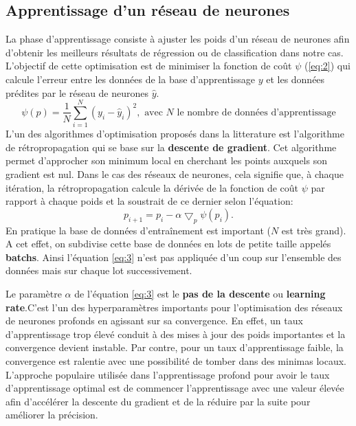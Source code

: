     \subsection{Apprentissage d'un réseau de neurones}
    La phase d’apprentissage consiste à ajuster les poids d’un réseau de neurones afin d’obtenir les meilleurs résultats de régression ou de classification dans notre cas. L’objectif de cette optimisation est de minimiser la fonction de coût $\psi$ (\ref{eq:2}) qui calcule l’erreur entre les données de la base d’apprentissage $y$ et les données prédites par le réseau de neurones $\hat{y}$.
    \begin{equation}\label{eq:2}
        \psi(p) = \frac{1}{N}\sum_{i=1}^{N}(y_{i}-\hat{y}_{i})^{2}, \text{ avec } N \text{ le nombre de données d'apprentissage}
    \end{equation}
    L'un des algorithmes d'optimisation proposés dans la litterature est l’algorithme de rétropropagation qui se base sur la \textbf{descente de gradient}. Cet algorithme permet d’approcher son minimum local en cherchant les points auxquels son gradient est nul. Dans le cas des réseaux de neurones, cela signifie que, à chaque itération, la rétropropagation calcule la dérivée de la fonction de coût $\psi$ par rapport à chaque poids et la soustrait de ce dernier selon l’équation:
    \begin{equation}\label{eq:3}
        p_{i+1} = p_{i} - \alpha\bigtriangledown_{p}\psi(p_{i}).
    \end{equation}
    En pratique la base de données d'entraînement est important ($N$ est très grand). A cet effet, on subdivise cette base de données en lots de petite taille appelés \textbf{batchs}. Ainsi l'équation \ref{eq:3} n'est pas appliquée d'un coup sur l'ensemble des données mais sur chaque lot successivement.
    
    Le paramètre $\alpha$ de l’équation \ref{eq:3} est le \textbf{pas de la descente} ou \textbf{learning rate}.C'est l’un des hyperparamètres importants pour l’optimisation des réseaux de neurones profonds en agissant sur sa convergence. En effet, un taux d’apprentissage trop élevé conduit à des mises à jour des poids importantes et la convergence devient instable. Par contre, pour un taux d’apprentissage faible, la convergence est ralentie avec une possibilité de tomber dans des minimas locaux. L’approche populaire utilisée dans l’apprentissage profond pour avoir le taux d’apprentissage optimal est de commencer l’apprentissage avec une valeur élevée afin d’accélérer la descente du gradient et de la réduire par la suite pour améliorer la précision.\cite{dahmaneThesis}
    
